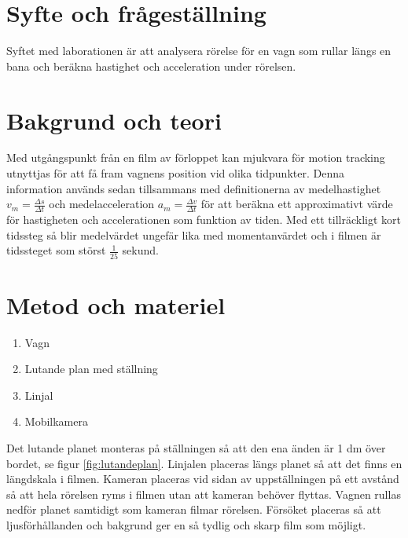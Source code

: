 \documentclass[11p, titlepage, oneside, a4paper]{article}
\begin{document}
	\newpage

	
	\setlength{\parindent}{0pt}
	\setlength{\parskip}{10pt}
	
	\section{Syfte och frågeställning}
		Syftet med laborationen är att analysera rörelse för en vagn som rullar längs en bana och beräkna hastighet och acceleration under rörelsen.

	\section{Bakgrund och teori}
        Med utgångspunkt från en film av förloppet kan mjukvara för motion tracking utnyttjas för att få fram vagnens position vid olika tidpunkter. Denna information används sedan tillsammans med definitionerna av medelhastighet $v_m = \frac{\Delta s}{\Delta t}$ och medelacceleration $a_m = \frac{\Delta v}{\Delta t}$ för att beräkna ett approximativt värde för hastigheten och accelerationen som funktion av tiden. Med ett tillräckligt kort tidssteg så blir medelvärdet ungefär lika med momentanvärdet och i filmen är tidssteget som störst $\frac{1}{25}$ sekund.  \parencite{impuls}
	

	\section{Metod och materiel}
        \begin{enumerate}
            \item Vagn
            \item Lutande plan med ställning
            \item Linjal
            \item Mobilkamera
        \end{enumerate}
        
        Det lutande planet monteras på ställningen så att den ena änden är 1 dm över bordet, se figur \ref{fig:lutandeplan}. Linjalen placeras längs planet så att det finns en längdskala  i filmen. Kameran placeras vid sidan av uppställningen på ett avstånd så att hela rörelsen ryms i filmen utan att kameran behöver flyttas. Vagnen rullas nedför planet samtidigt som kameran filmar rörelsen. Försöket placeras så att ljusförhållanden och bakgrund ger en så tydlig och skarp film som möjligt.
        
\end{document}
